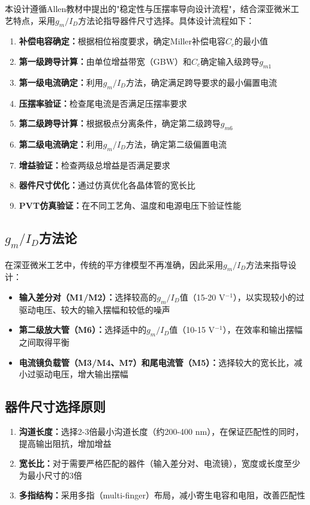 \documentclass[UTF8,12pt,a4paper]{ctexart}
\begin{document}
本设计遵循Allen教材中提出的"稳定性与压摆率导向设计流程"，结合深亚微米工艺特点，采用$g_m/I_D$方法论指导器件尺寸选择。具体设计流程如下：

\begin{enumerate}
    \item \textbf{补偿电容确定：}根据相位裕度要求，确定Miller补偿电容$C_c$的最小值
    \item \textbf{第一级跨导计算：}由单位增益带宽（GBW）和$C_c$确定输入级跨导$g_{m1}$
    \item \textbf{第一级电流确定：}利用$g_m/I_D$方法，确定满足跨导要求的最小偏置电流
    \item \textbf{压摆率验证：}检查尾电流是否满足压摆率要求
    \item \textbf{第二级跨导计算：}根据极点分离条件，确定第二级跨导$g_{m6}$
    \item \textbf{第二级电流确定：}利用$g_m/I_D$方法，确定第二级偏置电流
    \item \textbf{增益验证：}检查两级总增益是否满足要求
    \item \textbf{器件尺寸优化：}通过仿真优化各晶体管的宽长比
    \item \textbf{PVT仿真验证：}在不同工艺角、温度和电源电压下验证性能
\end{enumerate}

\subsection{$g_m/I_D$方法论}

在深亚微米工艺中，传统的平方律模型不再准确，因此采用$g_m/I_D$方法来指导设计：

\begin{itemize}
    \item \textbf{输入差分对（M1/M2）：}选择较高的$g_m/I_D$值（15-20 V$^{-1}$），以实现较小的过驱动电压、较大的输入摆幅和较低的噪声
    \item \textbf{第二级放大管（M6）：}选择适中的$g_m/I_D$值（10-15 V$^{-1}$），在效率和输出摆幅之间取得平衡
    \item \textbf{电流镜负载管（M3/M4、M7）和尾电流管（M5）：}选择较大的宽长比，减小过驱动电压，增大输出摆幅
\end{itemize}

\subsection{器件尺寸选择原则}

\begin{enumerate}
    \item \textbf{沟道长度：}选择2-3倍最小沟道长度（约200-400 nm），在保证匹配性的同时，提高输出阻抗，增加增益
    \item \textbf{宽长比：}对于需要严格匹配的器件（输入差分对、电流镜），宽度或长度至少为最小尺寸的3倍
    \item \textbf{多指结构：}采用多指（multi-finger）布局，减小寄生电容和电阻，改善匹配性
\end{enumerate}
\end{document}
